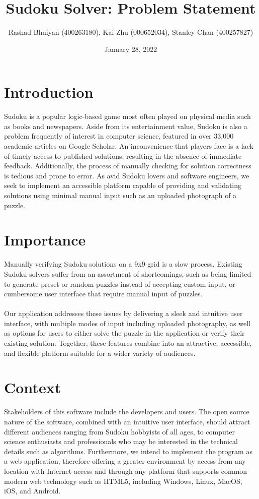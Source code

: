 \documentclass[11pt]{article}
\title{Sudoku Solver: Problem Statement}
\author{Rashad Bhuiyan (400263180), Kai Zhu (000652034), Stanley Chan (400257827)}
\date{January 28, 2022}
\begin{document}
\maketitle

\section{Introduction}
Sudoku is a popular logic-based game most often played on physical media such as books and 
newspapers. Aside from its entertainment value, Sudoku is also a problem frequently of interest in computer science, featured in over 33,000 academic articles on Google Scholar. An inconvenience that players face is a lack of timely access to published solutions, resulting in the absence of immediate feedback. Additionally, the process of manually checking for solution correctness is tedious and prone to error. As avid Sudoku lovers and software engineers, we seek to implement an accessible platform capable of providing and validating solutions using minimal manual input such as an uploaded photograph of a puzzle.


\section{Importance}
Manually verifying Sudoku solutions on a 9x9 grid is a slow process. Existing Sudoku solvers suffer from an assortment of shortcomings, such as being limited to generate preset or random puzzles instead of accepting custom input, or cumbersome user interface that require manual input of puzzles.
\\
\\
Our application addresses these issues by delivering a sleek and intuitive user interface, with multiple modes of input including uploaded photography, as well as options for users to either solve the puzzle in the application or verify their existing solution. Together, these features combine into an attractive, accessible, and flexible platform suitable for a wider variety of audiences.

\section{Context}
Stakeholders of this software include the developers and users. The open source nature of the software, combined with an intuitive user interface, should attract different audiences ranging from Sudoku hobbyists of all ages, to computer science enthusiasts and professionals who may be interested in the technical details such as algorithms. Furthermore, we intend to implement the program as a web application, therefore offering a greater environment by access from any location with Internet access and through any platform that supports common modern web technology such as HTML5, including Windows, Linux, MacOS, iOS, and Android.
\end{document}
